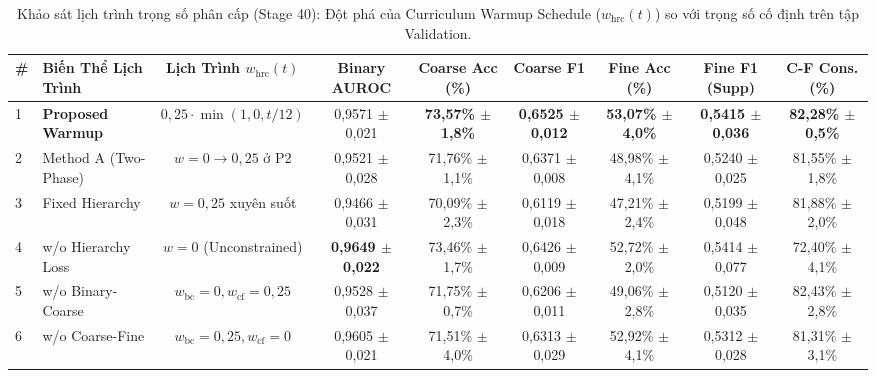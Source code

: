 \begin{table}[t]
\centering
\small
\caption{Khảo sát lịch trình trọng số phân cấp (Stage 40): Đột phá của Curriculum Warmup Schedule ($w_{\text{hrc}}(t)$) so với trọng số cố định trên tập Validation.}
\label{tab:ablation_hierarchy_schedule}
\begin{adjustbox}{width=\textwidth}
\begin{tabular}{llccccccc}
\toprule
\textbf{\#} & \textbf{Biến Thể Lịch Trình} & \textbf{Lịch Trình $w_{\text{hrc}}(t)$} & \textbf{Binary AUROC} & \textbf{Coarse Acc (\%)} & \textbf{Coarse F1} & \textbf{Fine Acc (\%)} & \textbf{Fine F1 (Supp)} & \textbf{C-F Cons. (\%)} \\
\midrule
1 & \textbf{Proposed Warmup} & $0{,}25 \cdot \min(1{,}0, t/12)$ & 0,9571 $\pm$ 0,021 & \textbf{73,57\% $\pm$ 1,8\%} & \textbf{0,6525 $\pm$ 0,012} & \textbf{53,07\% $\pm$ 4,0\%} & \textbf{0,5415 $\pm$ 0,036} & \textbf{82,28\% $\pm$ 0,5\%} \\
2 & Method A (Two-Phase) & $w=0 \rightarrow 0{,}25$ ở P2 & 0,9521 $\pm$ 0,028 & 71,76\% $\pm$ 1,1\% & 0,6371 $\pm$ 0,008 & 48,98\% $\pm$ 4,1\% & 0,5240 $\pm$ 0,025 & 81,55\% $\pm$ 1,8\% \\
3 & Fixed Hierarchy & $w=0{,}25$ xuyên suốt & 0,9466 $\pm$ 0,031 & 70,09\% $\pm$ 2,3\% & 0,6119 $\pm$ 0,018 & 47,21\% $\pm$ 2,4\% & 0,5199 $\pm$ 0,048 & 81,88\% $\pm$ 2,0\% \\
4 & w/o Hierarchy Loss & $w=0$ (Unconstrained) & \textbf{0,9649 $\pm$ 0,022} & 73,46\% $\pm$ 1,7\% & 0,6426 $\pm$ 0,009 & 52,72\% $\pm$ 2,0\% & 0,5414 $\pm$ 0,077 & 72,40\% $\pm$ 4,1\% \\
5 & w/o Binary-Coarse & $w_{\text{bc}}=0, w_{\text{cf}}=0{,}25$ & 0,9528 $\pm$ 0,037 & 71,75\% $\pm$ 0,7\% & 0,6206 $\pm$ 0,011 & 49,06\% $\pm$ 2,8\% & 0,5120 $\pm$ 0,035 & 82,43\% $\pm$ 2,8\% \\
6 & w/o Coarse-Fine & $w_{\text{bc}}=0{,}25, w_{\text{cf}}=0$ & 0,9605 $\pm$ 0,021 & 71,51\% $\pm$ 4,0\% & 0,6313 $\pm$ 0,029 & 52,92\% $\pm$ 4,1\% & 0,5312 $\pm$ 0,028 & 81,31\% $\pm$ 3,1\% \\
\bottomrule
\end{tabular}
\end{adjustbox}
\end{table}
